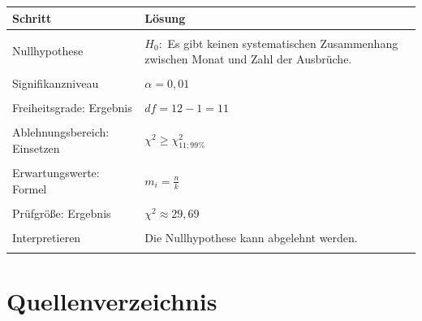 \documentclass[
  11pt,
  ngerman,
  a4paper,
]{report}
\begin{document}
\begin{table}[H]
\centering
\begin{tabular}{>{\raggedright\arraybackslash}p{8cm}>{\raggedright\arraybackslash}p{8cm}}
\toprule
\textbf{Schritt} & \textbf{Lösung}\\
\midrule
\cellcolor{gray!6}{Test wählen} & \cellcolor{gray!6}{Es soll geprüft werden, ob eine empirische Verteilung von einer erwarteten (uniformen) Verteilung abweicht.  Deshalb muss ein $\chi^2$-Anpassungstest durchgeführt werden.}\\
Nullhypothese & $H_0:$ Es gibt keinen systematischen Zusammenhang zwischen Monat und Zahl der Ausbrüche.\\
\cellcolor{gray!6}{Alternativhypothese} & \cellcolor{gray!6}{$H_1:$ Es gibt einen systematischen Zusammenhang zwischen Monat und Zahl der Ausbrüche.}\\
Signifikanzniveau & $\alpha=0{,}01$\\
\cellcolor{gray!6}{Freiheitsgrade: Formel} & \cellcolor{gray!6}{$\mathit{df}=k-1$}\\
Freiheitsgrade: Ergebnis & $\mathit{df}=12-1=11$\\
\cellcolor{gray!6}{Ablehnungsbereich: Formel} & \cellcolor{gray!6}{$\chi^2\geq\chi^2_{\mathit{df};(1-\alpha)}$}\\
Ablehnungsbereich: Einsetzen & $\chi^2\geq\chi^2_{11;99\%}$\\
\cellcolor{gray!6}{Ablehnungsbereich: Ergebnis} & \cellcolor{gray!6}{$\chi^2\geq24{,}725$}\\
Erwartungswerte: Formel & $m_{i}=\frac{n}{k}$\\
\cellcolor{gray!6}{Prüfgröße} & \cellcolor{gray!6}{$\chi^2= \sum_{i=1}^{k}\sum_{j=1}^{\ell}\frac{ (n_{ij}-m_{ij})^{2}}{m_{ij}}$}\\
Prüfgröße: Ergebnis & $\chi^2\approx 29{,}69$\\
\cellcolor{gray!6}{Interpretieren} & \cellcolor{gray!6}{Der Ablehnungsbereich wurde erreicht.}\\
Interpretieren & Die Nullhypothese kann abgelehnt werden.\\
\cellcolor{gray!6}{Interpretieren} & \cellcolor{gray!6}{Es gibt einen signifikanten Zusammenhang zwischen Monat und Anzahl der Vulkanausbrüche ($\alpha=0{,}01$).}\\
\bottomrule
\end{tabular}
\end{table}

\hypertarget{quellenverzeichnis}{%
\chapter*{Quellenverzeichnis}\label{quellenverzeichnis}}
\end{document}
